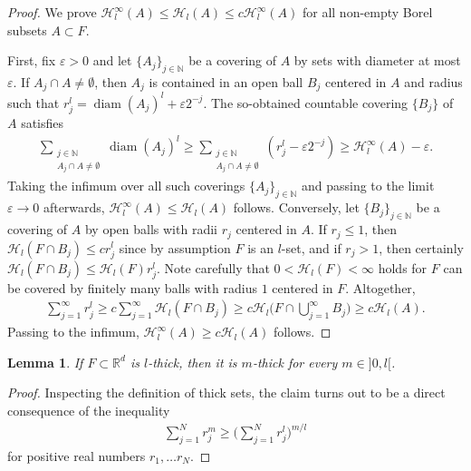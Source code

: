 \documentclass[10pt,leqno]{amsart}
\newtheorem{lemma}[theorem]{Lemma}
\theoremstyle{definition}
\numberwithin{equation}{section}
\begin{document}
\begin{proof}
We prove ${\mathcal{H}}^\infty_l(A) \leq {\mathcal{H}}_l(A) \leq c
{\mathcal{H}}^\infty_l(A)$ for all non-empty Borel subsets $A \subset F$. 

First, fix ${\varepsilon} > 0$ and let $\{A_j\}_{j \in {{\mathbb N}}}$ be a covering of $A$ by sets
with diameter at most ${\varepsilon}$. If $A_j \cap A \neq \emptyset$, then $A_j$ is
contained in an open ball $B_j$ centered in $A$ and radius such that $r_j^l =
{\operatorname{diam}}(A_j)^l + {\varepsilon} 2^{-j}$. The so-obtained countable covering $\{B_j\}$ of
$A$ satisfies
\begin{align*}
 \sum_{\substack{j \in {{\mathbb N}} \\ A_j \cap A \neq \emptyset}} {\operatorname{diam}}(A_j)^l
\geq \sum_{\substack{j \in {{\mathbb N}} \\ A_j \cap A \neq \emptyset}} (r_j^l - {\varepsilon}
2^{-j}) \geq {\mathcal{H}}^\infty_l(A) - {\varepsilon}.
\end{align*}
Taking the infimum over all such coverings $\{A_j\}_{j \in {{\mathbb N}}}$ and passing to
the limit ${\varepsilon} \to 0$ afterwards, ${\mathcal{H}}^\infty_l(A) \leq
{\mathcal{H}}_l(A)$
follows. Conversely, let $\{B_j\}_{j \in {{\mathbb N}}}$ be a covering of $A$ by
open balls with radii $r_j$ centered in $A$. If $r_j \leq 1$, then
${\mathcal{H}}_l(F \cap B_j) \leq c r_j^l$ since by assumption $F$ is an
$l$-set, and if $r_j > 1$, then certainly ${\mathcal{H}}_l(F \cap B_j)
\leq {\mathcal{H}}_l(F) r_j^l$. Note carefully that $0 < {\mathcal{H}}_l(F) <
\infty$ holds for $F$ can be covered by finitely many balls with radius $1$
centered in $F$. Altogether,
\begin{align*}
 \sum_{j= 1}^\infty r_j^l 
\geq c \sum_{j= 1}^\infty {\mathcal{H}}_l(F \cap B_j) 
\geq c{\mathcal{H}}_l \Big(F \cap \bigcup_{j=1}^\infty B_j \Big) \geq
c{\mathcal{H}}_l(A).
\end{align*}
Passing to the infimum, ${\mathcal{H}}^\infty_l(A) \geq c {\mathcal{H}}_l(A)$
follows.
\end{proof}

\begin{lemma}
\label{l-thickness for smaller values}
If $F \subset {{\mathbb R}}^d$ is $l$-thick, then it is $m$-thick for every $m \in
{]0,l[}$.
\end{lemma}

\begin{proof}
Inspecting the definition of thick sets, the claim turns out to be a direct
consequence of the inequality
\begin{align*}
 \sum_{j=1}^N r_j^m
\geq  \Big(\sum_{j=1}^N r_j^l \Big)^{m/l} 
\end{align*}
for positive real numbers $r_1,\ldots r_N$.
\end{proof}
\end{document}
